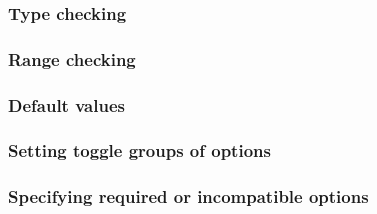   \subsubsection{Type checking}
   
   \subsubsection{Range checking}

   \subsubsection{Default values}

   \subsubsection{Setting toggle groups of options}

   \subsubsection{Specifying required or incompatible options}

